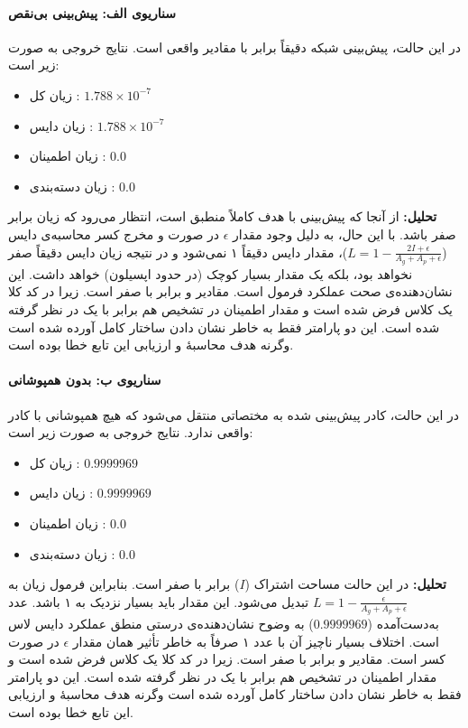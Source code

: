 \documentclass{article}
\begin{document}
\paragraph{سناریوی الف: پیش‌بینی بی‌نقص }
در این حالت، پیش‌بینی شبکه دقیقاً برابر با مقادیر واقعی است. نتایج خروجی به صورت زیر است:
\begin{itemize}
	\item زیان کل : $1.788 \times 10^{-7}$
	\item زیان دایس : $1.788 \times 10^{-7}$
	\item زیان اطمینان : $0.0$
	\item زیان دسته‌بندی : $0.0$
\end{itemize}
\textbf{تحلیل:} از آنجا که پیش‌بینی با هدف کاملاً منطبق است، انتظار می‌رود که زیان برابر صفر باشد. با این حال، به دلیل وجود مقدار $\epsilon$ در صورت و مخرج کسر محاسبه‌ی دایس ($L = 1 - \frac{2I + \epsilon}{A_g + A_p + \epsilon}$)، مقدار دایس دقیقاً ۱ نمی‌شود و در نتیجه زیان دایس دقیقاً صفر نخواهد بود، بلکه یک مقدار بسیار کوچک (در حدود اپسیلون) خواهد داشت. این نشان‌دهنده‌ی صحت عملکرد فرمول است.
مقادیر  و   برابر با صفر است. زیرا در کد کلا یک کلاس فرض شده است و مقدار اطمینان در تشخیص هم برابر با یک در نظر گرفته شده است. این دو پارامتر فقط به خاطر نشان دادن ساختار کامل  آورده شده است وگرنه هدف محاسبۀ  و ارزیابی این تابع خطا بوده است.

\paragraph{سناریوی ب: بدون همپوشانی }
در این حالت، کادر پیش‌بینی شده به مختصاتی منتقل می‌شود که هیچ همپوشانی با کادر واقعی ندارد. نتایج خروجی به صورت زیر است:
\begin{itemize}
	\item زیان کل : $0.9999969$
	\item زیان دایس : $0.9999969$
	\item زیان اطمینان : $0.0$
	\item زیان دسته‌بندی : $0.0$
\end{itemize}
\textbf{تحلیل:} در این حالت مساحت اشتراک ($I$) برابر با صفر است. بنابراین فرمول زیان به $L = 1 - \frac{\epsilon}{A_g + A_p + \epsilon}$ تبدیل می‌شود. این مقدار باید بسیار نزدیک به ۱ باشد. عدد به‌دست‌آمده ($0.9999969$) به وضوح نشان‌دهنده‌ی درستی منطق عملکرد دایس لاس است. اختلاف بسیار ناچیز آن با عدد ۱ صرفاً به خاطر تأثیر همان مقدار $\epsilon$ در صورت کسر است.
مقادیر  و   برابر با صفر است. زیرا در کد کلا یک کلاس فرض شده است و مقدار اطمینان در تشخیص هم برابر با یک در نظر گرفته شده است. این دو پارامتر فقط به خاطر نشان دادن ساختار کامل  آورده شده است وگرنه هدف محاسبۀ  و ارزیابی این تابع خطا بوده است.
\end{document}
